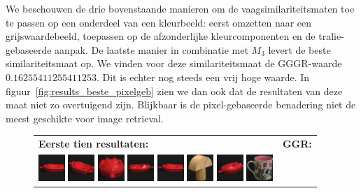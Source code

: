 We beschouwen de drie bovenstaande manieren om de vaagsimilariteitsmaten toe te passen op een 
onderdeel van een kleurbeeld:
eerst omzetten naar een grijswaardebeeld, 
toepassen op de afzonderlijke kleurcomponenten en 
de tralie-gebaseerde aanpak.
De laatste manier in combinatie met $M_{3}$ levert de beste similariteitsmaat op. We vinden
voor deze similariteitsmaat de GGGR-waarde $0.16255411255411253$. Dit is echter nog steeds een
vrij hoge waarde. In figuur~\ref{fig:results_beste_pixelgeb}
zien we dan ook dat de resultaten van deze maat niet zo overtuigend zijn. Blijkbaar 
is de pixel-gebaseerde benadering niet de meest geschikte voor image retrieval. 

\begin{figure}[tbp]
\begin{center}
\begin{tabular}{m{11cm} | m{3cm} |}
\textbf{Eerste tien resultaten:} & \textbf{GGR:} \\
\vspace{4pt}
\includegraphics[width=1cm]{coil/beeld-18.eps}
\includegraphics[width=1cm]{coil/beeld-22.eps}
\includegraphics[width=1cm]{coil/beeld-20.eps}
\includegraphics[width=1cm]{coil/beeld-19.eps}
\includegraphics[width=1cm]{coil/beeld-18.eps}
\includegraphics[width=1cm]{coil/beeld-3.eps}
\includegraphics[width=1cm]{coil/beeld-21.eps}
\includegraphics[width=1cm]{coil/beeld-7.eps}

\end{tabular}
\end{center}
\end{figure}
